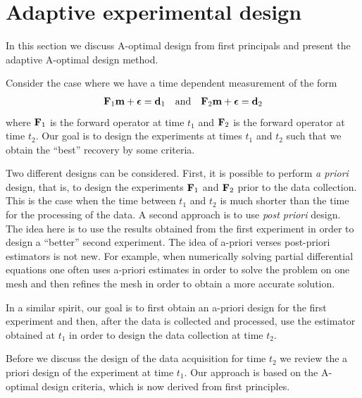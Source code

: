 \documentclass[11pt]{article}
\newcommand{\bfF}	{{\bf{F}}}
\newcommand{\bfd}	{{\bf{d}}}
\newcommand{\bfm}	{{\bf{m}}}
\newcommand{\bfepsilon} {{\boldsymbol \epsilon}}
\begin{document}
{\section{ Adaptive experimental design }
\label{sec: Adaptive}
In this section we discuss A-optimal design from first principals and  present the adaptive A-optimal design method.   

\bigskip

Consider the case where we have a time dependent measurement of the form
\begin{eqnarray}
\label{data}
\bfF_{1} \bfm + \bfepsilon = \bfd_{1}\quad {\rm and} \quad \bfF_{2} \bfm + \bfepsilon = \bfd_{2}
\end{eqnarray}
where $\bfF_{1}$ is the forward operator at time $t_{1}$ and $\bfF_{2}$ is the forward operator 
at time $t_{2}$.
Our goal is to design the experiments at times $t_{1}$ and $t_{2}$ such that we obtain the ``best''
recovery by some criteria.

Two different designs can be considered. First, it is possible to perform {\em a priori} design, that is,
to design the experiments $\bfF_{1}$ and $\bfF_{2}$ prior to the data collection. This is the case
when the time between $t_{1}$ and $t_{2}$ is much shorter than the time for the processing
of the data. A second approach is to use {\em post priori} design. The idea here is to use the 
results obtained from the first experiment in order to design a ``better'' second experiment.
The idea of a-priori verses post-priori  estimators is not new. For example, when numerically 
solving partial differential
equations one often uses a-priori estimates in order to solve the problem on one mesh 
and then refines the mesh in order to obtain a more accurate solution.

In a similar spirit, our goal is to first obtain an a-priori design for the first experiment
and then, after the data is collected and processed, use the estimator
obtained at $t_{1}$ in order  to design the data collection
at time $t_{2}$.

Before we discuss the design of the data acquisition for time $t_{2}$
 we review the a priori design of the experiment at time $t_{1}$. Our approach is based
 on the  A-optimal design criteria, which is now derived from first principles.
 
}
\end{document}
